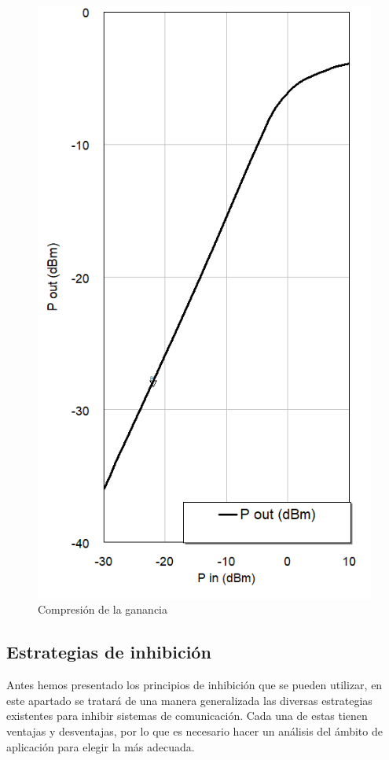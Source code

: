 \begin{figure}[htb]
	\centering
	\includegraphics[scale=0.4]{images/no_linealidad_e_tercer_orden.png}
	\caption{Compresión de la ganancia}
	\label{no_linealidad_e_tercer_orden}
\end{figure}

\subsection{Estrategias de inhibición}

Antes hemos presentado los principios de inhibición que se pueden utilizar, en este apartado se tratará de una manera generalizada las diversas 
estrategias existentes para inhibir sistemas de comunicación. Cada una de estas tienen ventajas y desventajas, por lo que es necesario
hacer un análisis del ámbito de aplicación para elegir la más adecuada.



